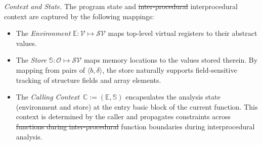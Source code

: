 \documentclass[manuscript,screen,review]{acmart}
\theoremstyle{indenteditalic}
\newcommand{\kw}[1]{{\it #1}} %
\providecommand{\DIFaddtex}[1]{{\protect\color{blue}#1}} %
\providecommand{\DIFidentity}[1]{#1}
\providecommand{\DIFdeltex}[1]{{%
  \protect\color{red}%
  \normalfont\normalsize
  \let\textbf\DIFidentity
  \let\textit\DIFidentity
  \let\texttt\DIFidentity
  \let\textsc\DIFidentity
  \let\textsf\DIFidentity
  \let\emph\DIFidentity
  \let\uline\DIFidentity
  \sout{#1}%
}} %
\providecommand{\DIFaddbegin}{} %
\providecommand{\DIFaddend}{} %
\providecommand{\DIFdelbegin}{} %
\providecommand{\DIFdelend}{} %
\providecommand{\DIFadd}[1]{\texorpdfstring{\DIFaddtex{#1}}{#1}} %
\providecommand{\DIFdel}[1]{\texorpdfstring{\DIFdeltex{#1}}{}} %
\begin{document}
\textit{Context and State.}
The program state and \DIFdelbegin \DIFdel{inter-procedural }\DIFdelend \DIFaddbegin \DIFadd{interprocedural }\DIFaddend context are captured by the following mappings:
\begin{itemize}
	\item The \kw{Environment} $\mathbb{E}: \mathcal{V} \mapsto \mathcal{SV}$ maps top-level virtual registers to their abstract values.
	\item The \kw{Store} $\mathbb{S}: \mathcal{O} \mapsto \mathcal{SV}$ maps memory locations to the values stored therein. By mapping from pairs of $\langle b, \delta \rangle$, the store naturally supports field-sensitive tracking of structure fields and array elements.
	\item The \kw{Calling Context}~$\mathbb{C} := (\mathbb{E}, \mathbb{S})$ encapsulates the analysis state (environment and store) at the entry basic block of the current function. This context is determined by the caller and propagates constraints across \DIFdelbegin \DIFdel{functions during inter-procedural }\DIFdelend \DIFaddbegin \DIFadd{function boundaries during interprocedural }\DIFaddend analysis.
\end{itemize}

\DIFdelbegin %
\end{document}
